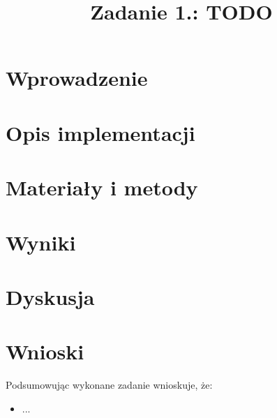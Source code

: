 \documentclass{classrep}
\author{%
    \studentinfo[216806@edu.p.lodz.pl]{Kamil Kowalewski TODO}{216806}
}
\title{Zadanie 1.: TODO}
\begin{document}
    \maketitle
    \thispagestyle{fancyplain}

    \section{Wprowadzenie} {

    }

    \section{Opis implementacji} {

    }

    \section{Materiały i metody} {

    }

    \section{Wyniki} {

    }

    \section{Dyskusja} {

    }

    \section{Wnioski} {
        Podsumowując wykonane zadanie wnioskuje, że:
        \begin{itemize}
            \item ...

        \end{itemize}
    }

    \begin{thebibliography}{0}
    \end{thebibliography}
\end{document}
